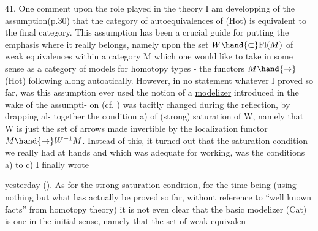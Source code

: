 41. One comment  upon the role played in the theory I am developping of
the assumption(p.30) that the category of autoequivalences of (Hot) is
equivalent to the final category. This assumption has been a crucial
guide for putting the emphasis where it really belongs, namely upon
the set  $W\hand{\subset}\mathrm{Fl}(M)$ of weak equivalences within a category M which one
would like to take in some sense as a category of models for homotopy
types - the functors $M\hand{\to}$(Hot) following along autoatically. However,
in no statement whatever I proved so far, was this assumption ever used
 the notion of a \uline{modelizer} introduced in the wake of the assumpti-%
on (cf. ) was tacitly changed during the reflection, by drapping al-%
together the condition a) of (strong) saturation of W, namely that W is
just the set of arrows\unsure{\hand{,}} made invertible by the localization functor $M\hand{\to}W^{-1}M$.
Instead of this, it turned out that the saturation condition we really had
at hands and which  was adequate for working, was the conditions
a) to c) I finally wrote  yesterday (). As for the
strong saturation condition, for the time being (using nothing but what
has actually be proved so far, without reference to ``well known facts''
from homotopy theory)\hand{,} it is not even clear that the basic modelizer
(Cat) is one in the initial sense, namely that the set of weak equivalen-
